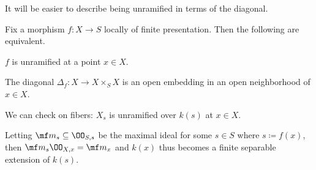 \documentclass[../notes.tex]{subfiles}
\begin{document}
It will be easier to describe being unramified in terms of the diagonal.
\begin{proposition}
	Fix a morphism $f\colon X\to S$ locally of finite presentation. Then the following are equivalent.
	\begin{listalph}
		\item $f$ is unramified at a point $x\in X$.
		\item The diagonal $\Delta_f\colon X\to X\times_SX$ is an open embedding in an open neighborhood of $x\in X$.
		\item We can check on fibers: $X_s$ is unramified over $k(s)$ at $x\in X$.
		\item Letting $\mf m_s\subseteq\OO_{S,s}$ be the maximal ideal for some $s\in S$ where $s\coloneqq f(x)$, then $\mf m_s\OO_{X,x}=\mf m_x$ and $k(x)$ thus becomes a finite separable extension of $k(s)$.
	\end{listalph}
\end{proposition}
\end{document}
